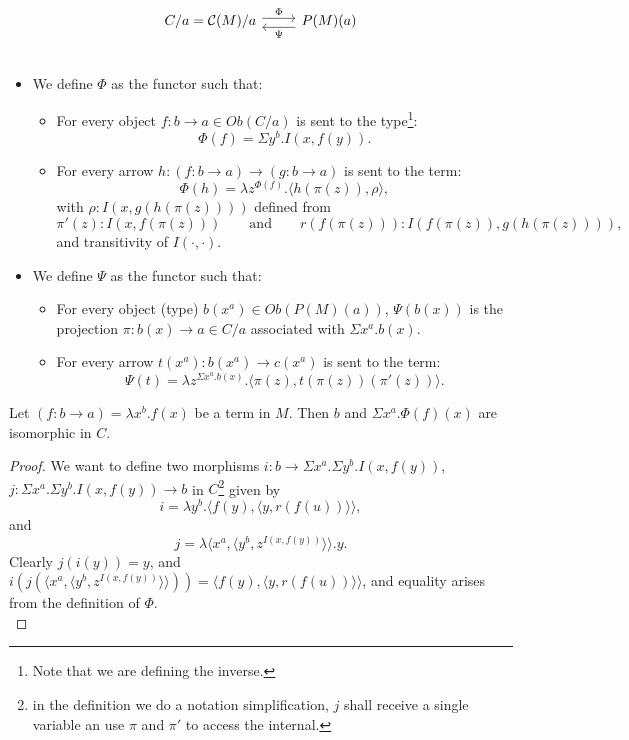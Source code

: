\[
  \begin{tikzcd}
    C/a=\CC(M)/a\arrow[ shift left=.5ex, "\Phi"{name=T}]{r}{} &
    P(M)(a)\arrow[ shift left=1ex, "\Psi"{name=i}]{l}{} \\
  \end{tikzcd}
\]
\begin{itemize}
\item We define $\Phi$ as the functor such that:

  \begin{itemize}
  \item For every object $f:b\to a\in Ob(C/a)$ is sent to the type\footnote{Note that we are defining the inverse.}:
    $$\Phi(f)=\Sigma y^b.I(x,f(y)).$$
  \item For every arrow $h: (f:b\to a)\to (g:b\to a)$ is sent to the term:
    $$\Phi(h) = \lambda z^{\Phi(f)}. \langle h(\pi(z)), \rho\rangle,$$
    with $\rho : I(x,g(h(\pi(z))))$ defined from $$\pi'(z) : I(x,f(\pi(z)))\qquad\text{and}\qquad r(f(\pi(z))) : I (f(\pi(z)), g(h(\pi(z)))),$$ and transitivity of $I(\cdot,\cdot)$.
  \end{itemize}

\item We define $\Psi$ as the functor such that:
  \begin{itemize}
  \item For every object (type) $b(x^a)\in Ob(P(M)(a))$, $\Psi(b(x))$ is the projection $\pi:b(x)\to a \in C/a$ associated with $\Sigma x^a. b(x)$.
  \item For every arrow $t(x^a): b(x^a) \to c(x^a)$ is sent to the term:
    $$\Psi(t) = \lambda z^{\Sigma x^a. b(x)}. \langle \pi(z), t(\pi(z))(\pi'(z))\rangle.$$
  \end{itemize}
\end{itemize}
\begin{lemma}\label{lemma:CM3}
  Let $(f: b\to a)= \lambda x^b.f(x)$ be a term in $M$. Then $b$ and $\Sigma x^a.\Phi(f)(x)$ are isomorphic in $C$.
\end{lemma}
\begin{proof}
  We want to define two morphisms $i:b \to \Sigma x^a. \Sigma y^b. I(x,f(y))$, $j : \Sigma x^a. \Sigma y^b. I(x,f(y)) \to b$ in $C$\footnote{in the definition we do a notation simplification, $j$ shall receive a single variable an use $\pi$ and $\pi'$ to access the internal.} given by
  $$i = \lambda y^b. \langle f(y),\langle y, r(f(u))\rangle \rangle,$$
  and
  $$j = \lambda \langle x^a, \langle y^b, z^{I(x,f(y))} \rangle\rangle . y .$$
  Clearly $j(i(y)) = y$, and $i(j(\langle x^a, \langle y^b, z^{I(x,f(y))} \rangle\rangle)) = \langle f(y),\langle y, r(f(u))\rangle \rangle$, and equality arises from the definition of $\Phi$.\\
\end{proof}


